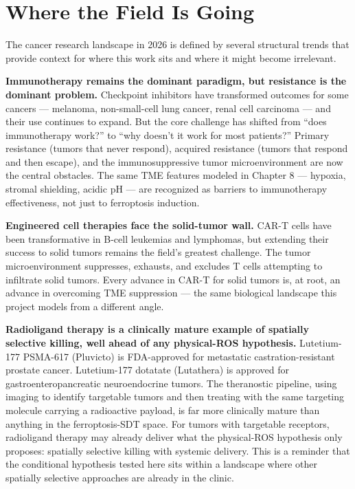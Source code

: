 \documentclass[11pt,twoside,openright]{report}
\begin{document}
\section{Where the Field Is Going}

The cancer research landscape in 2026 is defined by several structural trends that provide context for where this work sits and where it might become irrelevant.

\textbf{Immunotherapy remains the dominant paradigm, but resistance is the dominant problem.} Checkpoint inhibitors have transformed outcomes for some cancers --- melanoma, non-small-cell lung cancer, renal cell carcinoma --- and their use continues to expand. But the core challenge has shifted from ``does immunotherapy work?'' to ``why doesn't it work for most patients?'' Primary resistance (tumors that never respond), acquired resistance (tumors that respond and then escape), and the immunosuppressive tumor microenvironment are now the central obstacles. The same TME features modeled in Chapter 8 --- hypoxia, stromal shielding, acidic pH --- are recognized as barriers to immunotherapy effectiveness, not just to ferroptosis induction.

\textbf{Engineered cell therapies face the solid-tumor wall.} CAR-T cells have been transformative in B-cell leukemias and lymphomas, but extending their success to solid tumors remains the field's greatest challenge. The tumor microenvironment suppresses, exhausts, and excludes T cells attempting to infiltrate solid tumors. Every advance in CAR-T for solid tumors is, at root, an advance in overcoming TME suppression --- the same biological landscape this project models from a different angle.

\textbf{Radioligand therapy is a clinically mature example of spatially selective killing, well ahead of any physical-ROS hypothesis.} Lutetium-177 PSMA-617 (Pluvicto) is FDA-approved for metastatic castration-resistant prostate cancer. Lutetium-177 dotatate (Lutathera) is approved for gastroenteropancreatic neuroendocrine tumors. The theranostic pipeline, using imaging to identify targetable tumors and then treating with the same targeting molecule carrying a radioactive payload, is far more clinically mature than anything in the ferroptosis-SDT space. For tumors with targetable receptors, radioligand therapy may already deliver what the physical-ROS hypothesis only proposes: spatially selective killing with systemic delivery. This is a reminder that the conditional hypothesis tested here sits within a landscape where other spatially selective approaches are already in the clinic.
\end{document}
